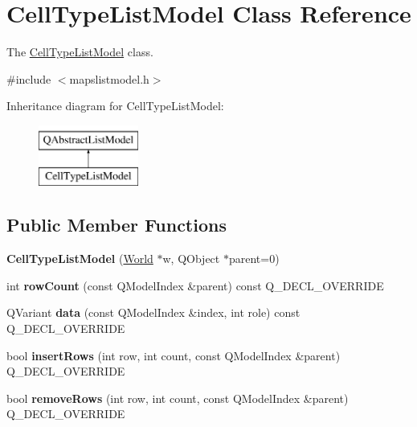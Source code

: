 \hypertarget{class_cell_type_list_model}{}\section{Cell\+Type\+List\+Model Class Reference}
\label{class_cell_type_list_model}


The \hyperlink{class_cell_type_list_model}{Cell\+Type\+List\+Model} class.  




{\ttfamily \#include $<$mapslistmodel.\+h$>$}

Inheritance diagram for Cell\+Type\+List\+Model\+:\begin{figure}[H]
\begin{center}
\leavevmode
\includegraphics[height=2.000000cm]{class_cell_type_list_model}
\end{center}
\end{figure}
\subsection*{Public Member Functions}
\begin{DoxyCompactItemize}
\item 
\hypertarget{class_cell_type_list_model_a3e5614c6b52577d4d673ac28e5b19c59}{}\label{class_cell_type_list_model_a3e5614c6b52577d4d673ac28e5b19c59} 
{\bfseries Cell\+Type\+List\+Model} (\hyperlink{class_world}{World} $\ast$w, Q\+Object $\ast$parent=0)
\item 
\hypertarget{class_cell_type_list_model_a4d19e3ec13380dc4ecfea9ceafdc78b9}{}\label{class_cell_type_list_model_a4d19e3ec13380dc4ecfea9ceafdc78b9} 
int {\bfseries row\+Count} (const Q\+Model\+Index \&parent) const Q\+\_\+\+D\+E\+C\+L\+\_\+\+O\+V\+E\+R\+R\+I\+DE
\item 
\hypertarget{class_cell_type_list_model_a949e9fd005335e0024fb66f63113078d}{}\label{class_cell_type_list_model_a949e9fd005335e0024fb66f63113078d} 
Q\+Variant {\bfseries data} (const Q\+Model\+Index \&index, int role) const Q\+\_\+\+D\+E\+C\+L\+\_\+\+O\+V\+E\+R\+R\+I\+DE
\item 
\hypertarget{class_cell_type_list_model_aeff00ffac0dd7bce76a505d2eabfed49}{}\label{class_cell_type_list_model_aeff00ffac0dd7bce76a505d2eabfed49} 
bool {\bfseries insert\+Rows} (int row, int count, const Q\+Model\+Index \&parent) Q\+\_\+\+D\+E\+C\+L\+\_\+\+O\+V\+E\+R\+R\+I\+DE
\item 
\hypertarget{class_cell_type_list_model_abe5727a0615f06531cfa271a607785a4}{}\label{class_cell_type_list_model_abe5727a0615f06531cfa271a607785a4} 
bool {\bfseries remove\+Rows} (int row, int count, const Q\+Model\+Index \&parent) Q\+\_\+\+D\+E\+C\+L\+\_\+\+O\+V\+E\+R\+R\+I\+DE
\end{DoxyCompactItemize}


